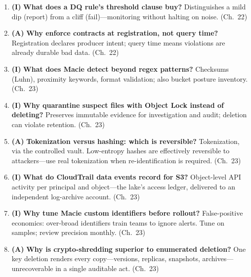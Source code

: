 \begin{enumerate}
    \item \textbf{(I)} \textbf{What does a DQ rule's threshold clause buy?}
    Distinguishes a mild dip (report) from a cliff (fail)---monitoring without halting on noise.
    (Ch.~22)
    \item \textbf{(A)} \textbf{Why enforce contracts at registration, not query time?}
    Registration declares producer intent; query time means violations are already durable bad
    data. (Ch.~22)
    \item \textbf{(I)} \textbf{What does Macie detect beyond regex patterns?}
    Checksums (Luhn), proximity keywords, format validation; also bucket posture inventory.
    (Ch.~23)
    \item \textbf{(I)} \textbf{Why quarantine suspect files with Object Lock instead of deleting?}
    Preserves immutable evidence for investigation and audit; deletion can violate retention.
    (Ch.~23)
    \item \textbf{(A)} \textbf{Tokenization versus hashing: which is reversible?}
    Tokenization, via the controlled vault. Low-entropy hashes are effectively reversible to
    attackers---use real tokenization when re-identification is required. (Ch.~23)
    \item \textbf{(I)} \textbf{What do CloudTrail data events record for S3?}
    Object-level API activity per principal and object---the lake's access ledger, delivered to an
    independent log-archive account. (Ch.~23)
    \item \textbf{(I)} \textbf{Why tune Macie custom identifiers before rollout?}
    False-positive economics: over-broad identifiers train teams to ignore alerts. Tune on samples;
    review precision monthly. (Ch.~23)
    \item \textbf{(A)} \textbf{Why is crypto-shredding superior to enumerated deletion?}
    One key deletion renders every copy---versions, replicas, snapshots, archives---unrecoverable in
    a single auditable act. (Ch.~23)
\end{enumerate}

